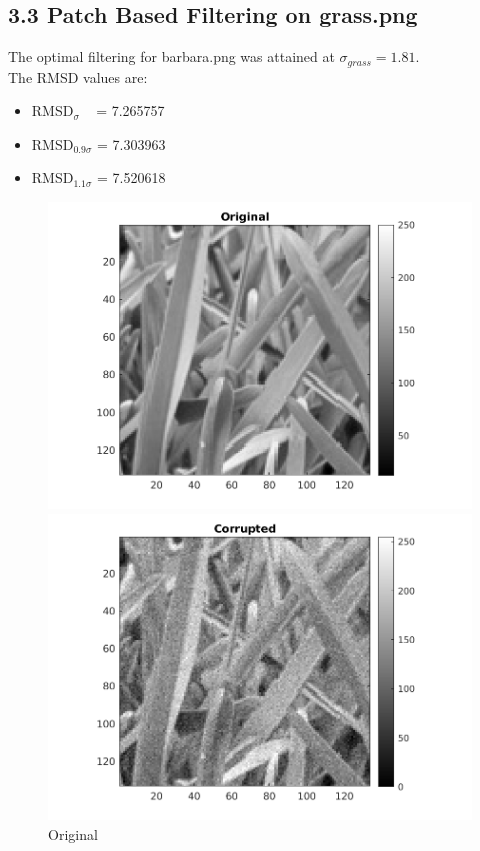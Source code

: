 \documentclass[12pt, a4paper]{article}
\begin{document}
\subsection*{3.3 Patch Based Filtering on grass.png}
\noindent The optimal filtering for barbara.png was attained at $\sigma_{grass} = 1.81$. \\
The RMSD values are:
\begin{itemize}
	\item RMSD$_{\sigma}\;\;\;$  = 7.265757
	\item RMSD$_{0.9\sigma}$ = 7.303963
	\item RMSD$_{1.1\sigma}$ = 7.520618
\end{itemize}
\begin{figure}[h]
    \centering
    \renewcommand{\thefigure}{3.3(a)}
    \begin{minipage}[c][1\width]{0.3\textwidth}
    	\hspace*{-1in}
    	\includegraphics[width=1.5\textwidth]{grass_original.png}
    	\caption{Original}
	    \label{fig:3.3(a)}
    \end{minipage}
    \renewcommand{\thefigure}{3.3(b)}
    \begin{minipage}[c][1\width]{0.3\textwidth}
    	\hspace*{-0.5in}
    	\includegraphics[width=1.5\textwidth]{grass_corrupted.png}

\end{minipage}
\end{figure}
\end{document}
